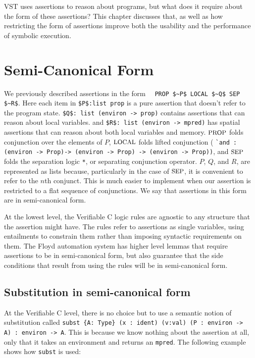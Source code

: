 \documentclass{puthesis}
\begin{document}
VST uses assertions to reason about programs, but what does 
it require about the form of these assertions? This chapter
discusses that, as well as how restricting the form of
assertions improve both the usability and the performance
of symbolic execution.

\section{Semi-Canonical Form}

We previously described \cite{appel14:plcc} assertions in the form
~~\lstinline{PROP $~P$ LOCAL $~Q$ SEP $~R$}.  Here each item in
\lstinline|$P$:list prop| is a pure assertion that doesn't refer to
the program state. \lstinline|$Q$: list (environ -> prop)| contains
assertions that can reason about local variables.  and 
\lstinline|$R$: list (environ -> mpred)| has spatial assertions that can reason about
both local variables and memory.  $\mbox{\small PROP}$ folds conjunction over the
elements of $P$, $\mbox{\small LOCAL}$ folds lifted conjunction ( 
\lstinline|`and : (environ -> Prop)-> (environ -> Prop) -> (environ -> Prop))|, and
$\mbox{\small SEP}$ folds the separation logic \lstinline|*|, or separating
conjunction operator. $P$, $Q$, and $R$, are represented as lists
because, particularly in the case of $\mbox{\small SEP}$, it is convenient to refer
to the $n$th conjunct. This is much easier to implement when our
assertion is restricted to a flat sequence of conjunctions.  We say
that assertions in this form are in semi-canonical form.

At the lowest level, the Verifiable C logic rules are agnostic to any
structure that the assertion might have. The rules refer to
assertions as single variables, using entailments to constrain them
rather than imposing syntactic requirements on them. The Floyd
automation system has higher level lemmas that require assertions
to be in semi-canonical form, but also guarantee that the side
conditions that result from using the rules will be in semi-canonical
form.

\subsection{Substitution in semi-canonical form}

At the Verifiable C level, there is no choice but to use a semantic
notion of substitution called \linebreak
\lstinline|subst {A: Type} (x : ident) (v:val) (P : environ -> A) : environ -> A|.
This is because we know nothing about the assertion at all, only that
it takes an environment and returns an \lstinline|mpred|. The following example
shows how \lstinline|subst| is used:
\end{document}
